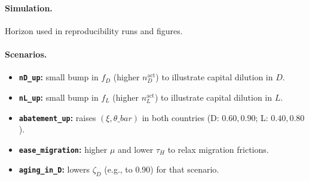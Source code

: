 \documentclass[12pt,a4paper]{article}
\newcommand{\code}[1]{\texttt{#1}}
\begin{document}
\paragraph{Simulation.}
\begin{description}[leftmargin=2.2in,style=nextline]
  \item[\code{T} = 200] 
\end{description}
\noindent Horizon used in reproducibility runs and figures.

\paragraph{Scenarios.}
\begin{itemize}[leftmargin=1.5em]
  \item \textbf{\code{nD\_up}:} small bump in \(f_D\) (higher \(n_D^{\text{act}}\)) to illustrate capital dilution in \(D\).
  \item \textbf{\code{nL\_up}:} small bump in \(f_L\) (higher \(n_L^{\text{act}}\)) to illustrate capital dilution in \(L\).
  \item \textbf{\code{abatement\_up}:} raises \((\xi,\theta\_bar)\) in both countries (D: \(0.60,0.90\); L: \(0.40,0.80\)).
  \item \textbf{\code{ease\_migration}:} higher \(\mu\) and lower \(\tau_H\) to relax migration frictions.
  \item \textbf{\code{aging\_in\_D}:} lowers \(\zeta_D\) (e.g., to \(0.90\)) for that scenario.
\end{itemize}



\end{document}
